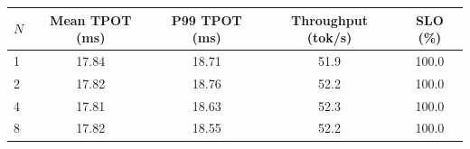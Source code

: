 \begin{tabular}{lcccc}\toprule
$N$ & Mean TPOT (ms) & P99 TPOT (ms) & Throughput (tok/s) & SLO (\%)\\
\midrule
1 & 17.84 & 18.71 & 51.9 & 100.0\\
2 & 17.82 & 18.76 & 52.2 & 100.0\\
4 & 17.81 & 18.63 & 52.3 & 100.0\\
8 & 17.82 & 18.55 & 52.2 & 100.0\\
\bottomrule\end{tabular}
